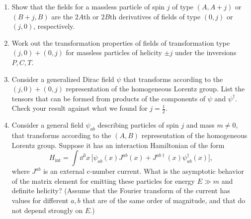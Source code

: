 \begin{enumerate}
\item Show that the fields for a massless particle of spin $j$ of type
$(A,A+j)$ or $(B+j,B)$ are the $2A$th or $2B$th derivatives of fields of
type $(0,j)$ or $(j,0)$, respectively.

\item Work out the transformation properties of fields of transformation
type $(j,0)+(0,j)$ for massless particles of helicity $\pm j$ under the
inversions $P,C,T$.

\item Consider a generalized Dirac field $\psi$ that transforms according to
the $(j,0)+(0,j)$ representation of the homogeneous Lorentz group. List the
tensors that can be formed from products of the components of $\psi$ and
$\psi^\dagger$. Check your result against what we found for $j=\tfrac12$.

\item Consider a general field $\psi_{ab}$ describing particles of spin $j$
and mass $m\ne0$, that transforms according to the $(A,B)$ representation of
the homogeneous Lorentz group. Suppose it has an interaction Hamiltonian of
the form
\[
  H_{\mathrm{int}}=\int \dd^3x\,
  \bigl[\psi_{ab}(x)J^{ab}(x)
    +J^{ab\dagger}(x)\psi_{ab}^\dagger(x)\bigr],
\]
where $J^{ab}$ is an external c-number current. What is the asymptotic
behavior of the matrix element for emitting these particles for energy
$E\gg m$ and definite helicity? (Assume that the Fourier transform of the
current has values for different $a,b$ that are of the same order of
magnitude, and that do not depend strongly on $E$.)
\end{enumerate}


